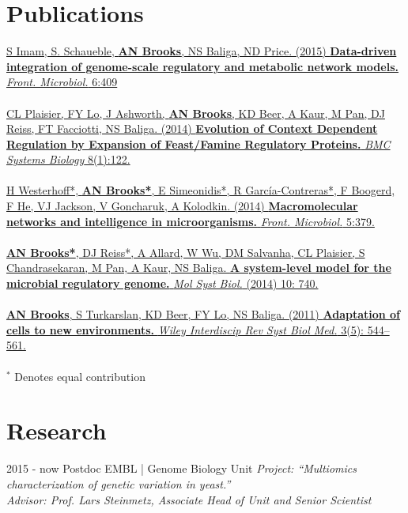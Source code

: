 \documentclass[]{friggeri-cv}
\begin{document}
\section{Publications}
\href{http://journal.frontiersin.org/article/10.3389/fmicb.2015.00409/abstract}{\noindent
S Imam, S. Schaueble,  \textbf{AN Brooks}, NS Baliga, ND Price. (2015)
\textbf{Data-driven integration of genome-scale regulatory and metabolic network models.}
\emph{Front. Microbiol.} 6:409
}
\\
\\
\href{http://www.biomedcentral.com/1752-0509/8/122}{\noindent
CL Plaisier, FY Lo, J Ashworth, \textbf{AN Brooks}, KD Beer, A Kaur, M Pan, DJ Reiss, FT Facciotti, NS Baliga. (2014)
\textbf{Evolution of Context Dependent Regulation by Expansion of Feast/Famine Regulatory Proteins.}
\emph{BMC Systems Biology} 8(1):122.
}
\\
\\
\href{http://journal.frontiersin.org/article/10.3389/fmicb.2014.00379/abstract}{\noindent
H Westerhoff*, \textbf{AN Brooks*}, E Simeonidis*, R García-Contreras*, F Boogerd, F He, VJ Jackson, V Goncharuk, A Kolodkin. (2014)
\textbf{Macromolecular networks and intelligence in microorganisms.}
\emph{Front. Microbiol.} 5:379.
}
\\
\\
\href{http://msb.embopress.org/cgi/pmidlookup?view=long&pmid=25028489}{\noindent
\textbf{AN Brooks*}, DJ Reiss*, A Allard, W Wu, DM Salvanha, CL Plaisier, S Chandrasekaran, M Pan, A Kaur, NS Baliga.
\textbf{A system-level model for the microbial regulatory genome.}
\emph{Mol Syst Biol.} (2014) 10: 740.
}
\\
\\
\href{http://www.ncbi.nlm.nih.gov/pubmed/21197660}{\noindent
\textbf{AN Brooks}, S Turkarslan, KD Beer, FY Lo, NS Baliga. (2011)
\textbf{Adaptation of cells to new environments.}
\emph{Wiley Interdiscip Rev Syst Biol Med.} 3(5): 544–561.
}
\\
\\
$^{\ast}$ Denotes equal contribution

\section{Research}
\begin{entrylist}
  \entry
    {2015 - now}
    {Postdoc}
    {EMBL | Genome Biology Unit}
    {\emph{Project: ``Multiomics characterization of genetic variation in yeast.''}\\
    \emph{Advisor: Prof. Lars Steinmetz, Associate Head of Unit and Senior Scientist}\\}
\end{entrylist}
\end{document}
